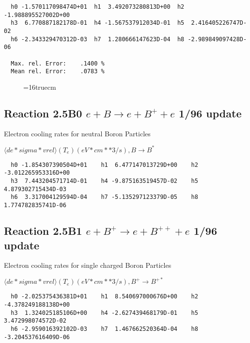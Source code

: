 \documentclass[12pt,dvipdfmx]{article}
\begin{document}
\begin{small}\begin{verbatim}
  h0 -1.570117098474D+01  h1  3.492073280813D+00  h2 -1.988895527002D+00
  h3  6.770887182178D-01  h4 -1.567537912034D-01  h5  2.416405226747D-02
  h6 -2.343329470312D-03  h7  1.280666147623D-04  h8 -2.989849097428D-06

  Max. rel. Error:    .1400 %
  Mean rel. Error:    .0783 %

\end{verbatim}\end{small}

\begin{figure} \label{2.4Bl}
\epsfxsize=16truecm
\end{figure}
\newpage

\subsection{
Reaction 2.5B0 $e + B \rightarrow e + B^+ + e $ 1/96 update
}

 Electron cooling rates for neutral
 Boron Particles

$  \langle de*sigma*vrel \rangle(T_e)  (eV*cm**3/s), B   \rightarrow B^* $


\begin{small}\begin{verbatim}
  h0 -1.854307390504D+01    h1  6.477147013729D+00    h2 -3.012265953316D+00
  h3  7.443204571714D-01    h4 -9.875163519457D-02    h5  4.879302715434D-03
  h6  3.317004129594D-04    h7 -5.135297123379D-05    h8  1.774782835741D-06
\end{verbatim}\end{small}

\subsection{
Reaction 2.5B1 $e + B^+ \rightarrow e + B^{++} + e $ 1/96 update
}

 Electron cooling rates for single
 charged Boron Particles

 $ \langle de*sigma*vrel \rangle(T_e)  (eV*cm**3/s), B^+ \rightarrow B^{+*} $


\begin{small}\begin{verbatim}
  h0 -2.025375436381D+01    h1  8.540697000676D+00    h2 -4.378249188138D+00
  h3  1.324025185106D+00    h4 -2.627439468179D-01    h5  3.472998074572D-02
  h6 -2.959016392102D-03    h7  1.467662520364D-04    h8 -3.204537616409D-06
\end{verbatim}\end{small}
\end{document}
